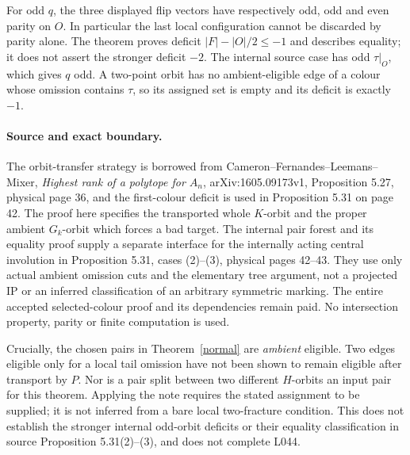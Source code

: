 \documentclass[11pt,a4paper]{article}
\begin{document}
For odd $q$, the three displayed flip vectors have respectively
odd, odd and even parity on $O$. In particular the last local
configuration cannot be discarded by parity alone. The theorem
proves deficit $|F|-|O|/2\le-1$ and describes equality; it does
not assert the stronger deficit $-2$. The internal source case
has odd $\tau|_O$, which gives $q$ odd. A two-point orbit has no
ambient-eligible edge of a colour whose omission contains $\tau$,
so its assigned set is empty and its deficit is exactly $-1$.

\paragraph{Source and exact boundary.}
The orbit-transfer strategy is borrowed from
Cameron--Fernandes--Leemans--Mixer, \emph{Highest rank of a polytope
for $A_n$}, arXiv:1605.09173v1, Proposition 5.27, physical page 36,
and the first-colour deficit is used in Proposition 5.31 on page 42.
The proof here specifies the transported whole $K$-orbit and the
proper ambient $G_k$-orbit which forces a bad target. The internal
pair forest and its equality proof supply a separate interface
for the internally acting central involution in Proposition 5.31,
cases (2)--(3), physical pages 42--43. They use only actual ambient
omission cuts and the elementary tree argument, not a projected IP
or an inferred classification of an arbitrary symmetric marking.
The entire accepted selected-colour proof and its dependencies remain
paid. No intersection property, parity or finite computation is used.

Crucially, the chosen pairs in Theorem~\ref{normal} are
\emph{ambient} eligible. Two edges eligible only for a local tail
omission have not been shown to remain eligible after transport
by $P$. Nor is a pair split between two different $H$-orbits an
input pair for this theorem. Applying the note requires the stated
assignment to be supplied; it is not inferred from a bare local
two-fracture condition. This does not establish the stronger internal
odd-orbit deficits or their equality classification in source
Proposition 5.31(2)--(3), and does not complete L044.
\end{document}
